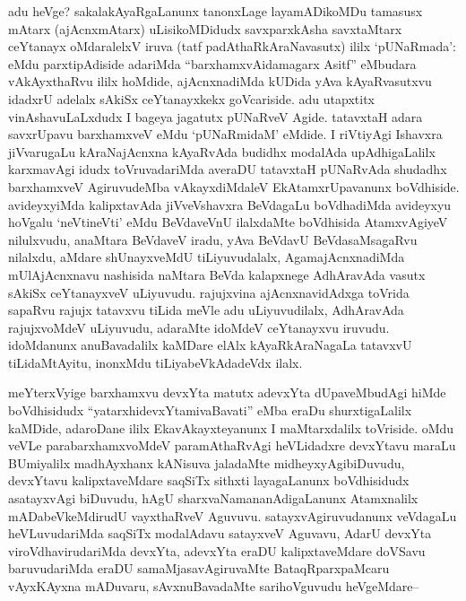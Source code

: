 
\begin{artha}
adu heVge? sakalakAyaRgaLanunx tanonxLage layamADikoMDu tamasusx mAtarx (ajAcnxmAtarx) uLisikoMDidudx savxparxkAsha savxtaMtarx ceYtanayx oMdaralelxV  iruva (tatf padAthaRkAraNavasutx) ililx `pUNaRmada': eMdu parxtipAdiside adariMda ``barxhamxvAidamagarx Asitf'' eMbudara vAkAyxthaRvu ililx hoMdide, ajAcnxnadiMda kUDida yAva kAyaRvasutxvu idadxrU adelalx sAkiSx ceYtanayxkekx goVcariside. adu utapxtitx vinAshavuLaLxdudx I bageya jagatutx pUNaRveV Agide. tatavxtaH adara savxrUpavu barxhamxveV eMdu `pUNaRmidaM' eMdide. I riVtiyAgi Ishavxra jiVvarugaLu kAraNajAcnxna kAyaRvAda budidhx modalAda upAdhigaLalilx karxmavAgi idudx toVruvadariMda averaDU tatavxtaH pUNaRvAda shudadhx barxhamxveV AgiruvudeMba vAkayxdiMdaleV EkAtamxrUpavanunx boVdhiside. avideyxyiMda kalipxtavAda jiVveVshavxra BeVdagaLu boVdhadiMda avideyxyu hoVgalu `neVtineVti' eMdu BeVdaveVnU ilalxdaMte boVdhisida AtamxvAgiyeV nilulxvudu, anaMtara BeVdaveV iradu, yAva BeVdavU BeVdasaMsagaRvu nilalxdu, aMdare shUnayxveMdU tiLiyuvudalalx, AgamajAcnxnadiMda mUlAjAcnxnavu nashisida naMtara BeVda kalapxnege AdhAravAda vasutx sAkiSx ceYtanayxveV uLiyuvudu. rajujxvina ajAcnxnavidAdxga toVrida sapaRvu rajujx tatavxvu tiLida meVle adu uLiyuvudilalx, AdhAravAda rajujxvoMdeV uLiyuvudu, adaraMte idoMdeV ceYtanayxvu iruvudu. idoMdanunx anuBavadalilx kaMDare elAlx kAyaRkAraNagaLa tatavxvU tiLidaMtAyitu, inonxMdu tiLiyabeVkAdadeVdx ilalx. 
\end{artha}


\begin{artha}
meYterxVyige barxhamxvu devxYta matutx adevxYta dUpaveMbudAgi hiMde boVdhisidudx ``yatarxhidevxYtamivaBavati'' eMba eraDu shurxtigaLalilx kaMDide, adaroDane ililx EkavAkayxteyanunx I maMtarxdalilx toVriside. oMdu veVLe parabarxhamxvoMdeV paramAthaRvAgi heVLidadxre devxYtavu maraLu BUmiyalilx madhAyxhanx kANisuva jaladaMte midheyxyAgibiDuvudu, devxYtavu kalipxtaveMdare saqSiTx sithxti layagaLanunx boVdhisidudx asatayxvAgi biDuvudu, hAgU sharxvaNamananAdigaLanunx Atamxnalilx mADabeVkeMdirudU vayxthaRveV Aguvuvu. satayxvAgiruvudanunx veVdagaLu heVLuvudariMda saqSiTx modalAdavu satayxveV Aguvavu, AdarU devxYta viroVdhavirudariMda devxYta, adevxYta eraDU kalipxtaveMdare doVSavu baruvudariMda eraDU samaMjasavAgiruvaMte BataqRparxpaMcaru vAyxKAyxna mADuvaru, sAvxnuBavadaMte sarihoVguvudu heVgeMdare{\rm --}
\end{artha}

